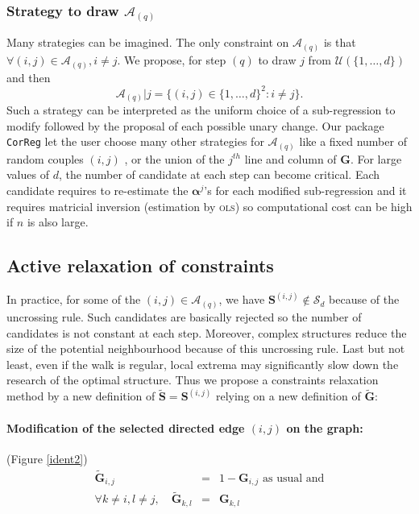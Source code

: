 \documentclass[12pt,a4paper]{report}
\begin{document}
		\subsubsection{Strategy to draw $\mathcal{A}_{(q)}$}
			Many strategies can be imagined. 
		The only constraint on $\mathcal{A}_{(q)}$ is that $\forall (i,j) \in \mathcal{A}_{(q)}, i\neq j$.				
		We propose, for step $(q)$ to draw $j$ from $\mathcal{U}(\{1,\dots,d\})$ and then 
		\begin{equation}
			\mathcal{A}_{(q)}|j=\{ (i,j) \in  \{1,\dots,d\}^2 :i \neq j \}.
		\end{equation}
			Such a strategy can be interpreted as the uniform choice of a sub-regression to modify followed by the proposal of each possible unary change.
			Our package {\tt CorReg} let the user choose many other strategies for $\mathcal{A}_{(q)}$ like a fixed number of random couples $(i,j)$ , or the union of the $j^{th}$ line and column of $\boldsymbol{G}$. For large values of $d$, the number of candidate at each step can become critical. Each candidate requires to re-estimate the $\boldsymbol{\alpha}^j$'s for each modified sub-regression and it requires matricial inversion (estimation by \textsc{ols}) so computational cost can be high if $n$ is also large.
		\subsection{Active relaxation of constraints}
		In practice, for some of the $(i,j) \in \mathcal{A}_{(q)}$, we have $\boldsymbol{S}^{(i,j)}\notin \mathcal{S}_d$ because of the uncrossing rule. Such candidates are basically rejected so the number of candidates is not constant at each step. Moreover, complex structures reduce the size of the potential neighbourhood because of this uncrossing rule. Last but not least, even if the walk is regular, local extrema may significantly slow down the research of the optimal structure.
		Thus we propose a constraints relaxation method by a new definition of $\tilde{\boldsymbol{S}}=\boldsymbol{S}^{(i,j)}$ relying on a new definition of $\tilde{\boldsymbol{G}}$:
		\paragraph{Modification of the selected directed edge $(i,j)$ on the graph:} (Figure \ref{ident2})
	\begin{eqnarray}
		\tilde{\boldsymbol{G}}_{i,j}&=&1-\boldsymbol{G}_{i,j} \textrm{ as usual and}\\
		\forall k \neq i, l\neq j, \quad	\tilde{\boldsymbol{G}}_{k,l}&=&\boldsymbol{G}_{k,l}
\end{eqnarray}	
\end{document}
